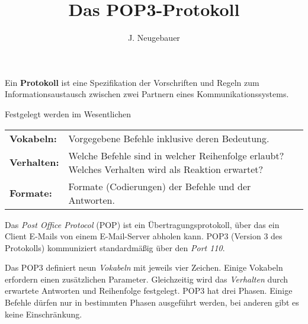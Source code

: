 \documentclass[10pt, a4paper]{scrartcl}
\author{J. Neugebauer}
\title{Das POP3-Protokoll}
\date{\Heute}
\begin{document}
\ReiheTitel

\begin{infobox}
Ein \textbf{Protokoll} ist eine Spezifikation der Vorschriften und Regeln zum Informationsaustausch zwischen zwei Partnern eines Kommunikationssystems.

Festgelegt werden im Wesentlichen

\begin{tabularx}{\textwidth}{lX}
	\textbf{Vokabeln:} & Vorgegebene Befehle inklusive deren Bedeutung. \\
	\textbf{Verhalten:} & Welche Befehle sind in welcher Reihenfolge erlaubt? Welches Verhalten wird als Reaktion erwartet?  \\
	\textbf{Formate:} & Formate (Codierungen) der Befehle und der Antworten.
\end{tabularx}
\end{infobox}

Das \emph{Post Office Protocol} (POP) ist ein Übertragungsprotokoll, über das ein Client E-Mails von einem E-Mail-Server abholen kann. POP3 (Version 3 des Protokolls) kommuniziert standardmäßig über den \emph{Port 110}.

Das POP3 definiert neun \emph{Vokabeln} mit jeweils vier Zeichen. Einige Vokabeln erfordern einen zusätzlichen Parameter. Gleichzeitig wird das \emph{Verhalten} durch erwartete Antworten und Reihenfolge festgelegt. POP3 hat drei Phasen. Einige Befehle dürfen nur in bestimmten Phasen ausgeführt werden, bei anderen gibt es keine Einschränkung.
\end{document}
